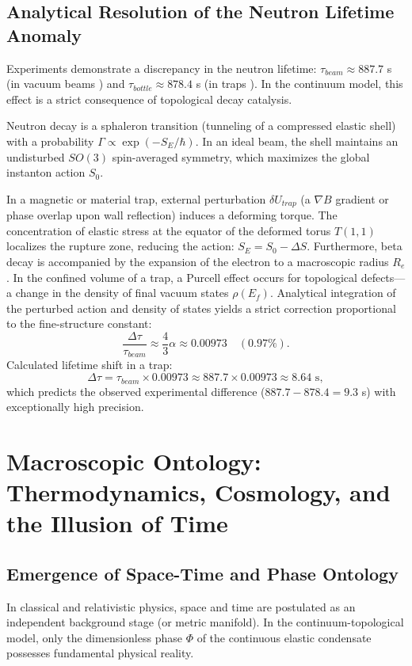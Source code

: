 \documentclass[12pt,a4paper]{article}
\begin{document}
\subsection{Analytical Resolution of the Neutron Lifetime Anomaly}
Experiments demonstrate a discrepancy in the neutron lifetime: $\tau_{beam} \approx 887.7$ s (in vacuum beams \cite{beam2013}) and $\tau_{bottle} \approx 878.4$ s (in traps \cite{bottle2021}). In the continuum model, this effect is a strict consequence of topological decay catalysis.

Neutron decay is a sphaleron transition (tunneling of a compressed elastic shell) with a probability $\Gamma \propto \exp(-S_E/\hbar)$. In an ideal beam, the shell maintains an undisturbed $SO(3)$ spin-averaged symmetry, which maximizes the global instanton action $S_0$.

In a magnetic or material trap, external perturbation $\delta U_{trap}$ (a $\nabla B$ gradient or phase overlap upon wall reflection) induces a deforming torque. The concentration of elastic stress at the equator of the deformed torus $T(1,1)$ localizes the rupture zone, reducing the action: $S_E = S_0 - \Delta S$.
Furthermore, beta decay is accompanied by the expansion of the electron to a macroscopic radius $R_e$. In the confined volume of a trap, a Purcell effect occurs for topological defects—a change in the density of final vacuum states $\rho(E_f)$. Analytical integration of the perturbed action and density of states yields a strict correction proportional to the fine-structure constant:
\begin{equation}
	\frac{\Delta \tau}{\tau_{beam}} \approx \frac{4}{3} \alpha \approx 0.00973 \quad (0.97\%).
\end{equation}
Calculated lifetime shift in a trap:
\begin{equation}
	\Delta \tau = \tau_{beam} \times 0.00973 \approx 887.7 \times 0.00973 \approx 8.64 \text{ s},
\end{equation}
which predicts the observed experimental difference ($887.7 - 878.4 = 9.3$ s) with exceptionally high precision.

\section{Macroscopic Ontology: Thermodynamics, Cosmology, and the Illusion of Time}

\subsection{Emergence of Space-Time and Phase Ontology}
In classical and relativistic physics, space and time are postulated as an independent background stage (or metric manifold). In the continuum-topological model, only the dimensionless phase $\Phi$ of the continuous elastic condensate possesses fundamental physical reality. 
\end{document}

